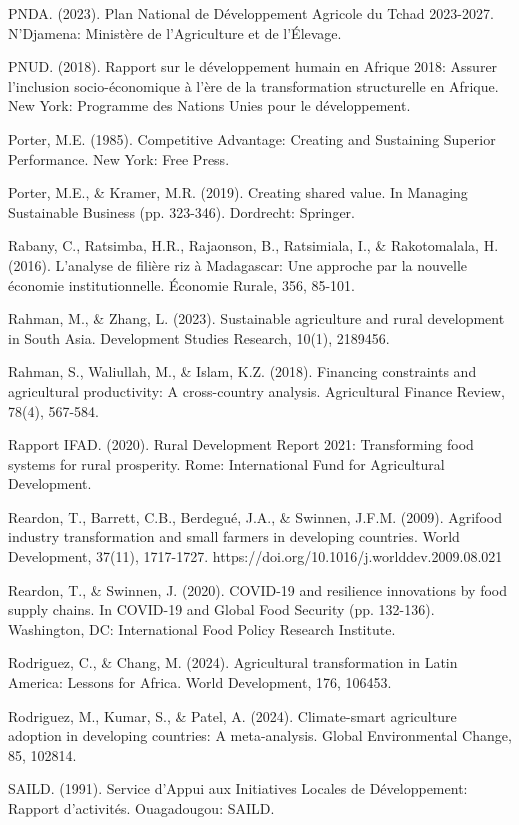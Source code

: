 \documentclass[12pt,oneside]{report}
\begin{document}
PNDA. (2023). Plan National de Développement Agricole du Tchad 2023-2027. N'Djamena: Ministère de l'Agriculture et de l'Élevage.

PNUD. (2018). Rapport sur le développement humain en Afrique 2018: Assurer l'inclusion socio-économique à l'ère de la transformation structurelle en Afrique. New York: Programme des Nations Unies pour le développement.

Porter, M.E. (1985). Competitive Advantage: Creating and Sustaining Superior Performance. New York: Free Press.

Porter, M.E., \& Kramer, M.R. (2019). Creating shared value. In Managing Sustainable Business (pp. 323-346). Dordrecht: Springer.

Rabany, C., Ratsimba, H.R., Rajaonson, B., Ratsimiala, I., \& Rakotomalala, H. (2016). L'analyse de filière riz à Madagascar: Une approche par la nouvelle économie institutionnelle. Économie Rurale, 356, 85-101.

Rahman, M., \& Zhang, L. (2023). Sustainable agriculture and rural development in South Asia. Development Studies Research, 10(1), 2189456.

Rahman, S., Waliullah, M., \& Islam, K.Z. (2018). Financing constraints and agricultural productivity: A cross-country analysis. Agricultural Finance Review, 78(4), 567-584.

Rapport IFAD. (2020). Rural Development Report 2021: Transforming food systems for rural prosperity. Rome: International Fund for Agricultural Development.

Reardon, T., Barrett, C.B., Berdegué, J.A., \& Swinnen, J.F.M. (2009). Agrifood industry transformation and small farmers in developing countries. World Development, 37(11), 1717-1727. https://doi.org/10.1016/j.worlddev.2009.08.021

Reardon, T., \& Swinnen, J. (2020). COVID-19 and resilience innovations by food supply chains. In COVID-19 and Global Food Security (pp. 132-136). Washington, DC: International Food Policy Research Institute.

Rodriguez, C., \& Chang, M. (2024). Agricultural transformation in Latin America: Lessons for Africa. World Development, 176, 106453.

Rodriguez, M., Kumar, S., \& Patel, A. (2024). Climate-smart agriculture adoption in developing countries: A meta-analysis. Global Environmental Change, 85, 102814.

SAILD. (1991). Service d'Appui aux Initiatives Locales de Développement: Rapport d'activités. Ouagadougou: SAILD.
\end{document}
